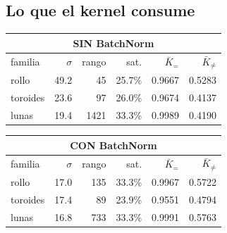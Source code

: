 \documentclass[11pt,a4paper]{article}
\begin{document}
\subsection{Lo que el kernel consume}
\noindent
\begin{minipage}[t]{0.49\textwidth}
  \centering
  \footnotesize\setlength{\tabcolsep}{3pt}
  \begin{tabular}{lrrrrr}
      \multicolumn{6}{c}{\textbf{SIN BatchNorm}} \\[2pt]
      \toprule
      familia & $\sigma$ & rango & sat. & $\bar K_{=}$ & $\bar K_{\neq}$ \\
      \midrule
      rollo & 49.2 & 45 & 25.7\% & 0.9667 & 0.5283 \\
      toroides & 23.6 & 97 & 26.0\% & 0.9674 & 0.4137 \\
      lunas & 19.4 & 1421 & 33.3\% & 0.9989 & 0.4190 \\
      \bottomrule
    \end{tabular}
\end{minipage}\hfill
\begin{minipage}[t]{0.49\textwidth}
  \centering
  \footnotesize\setlength{\tabcolsep}{3pt}
  \begin{tabular}{lrrrrr}
      \multicolumn{6}{c}{\textbf{CON BatchNorm}} \\[2pt]
      \toprule
      familia & $\sigma$ & rango & sat. & $\bar K_{=}$ & $\bar K_{\neq}$ \\
      \midrule
      rollo & 17.0 & 135 & 33.3\% & 0.9967 & 0.5722 \\
      toroides & 17.4 & 89 & 23.9\% & 0.9551 & 0.4794 \\
      lunas & 16.8 & 733 & 33.3\% & 0.9991 & 0.5763 \\
      \bottomrule
    \end{tabular}
\end{minipage}
\vspace{11pt}
\end{document}
